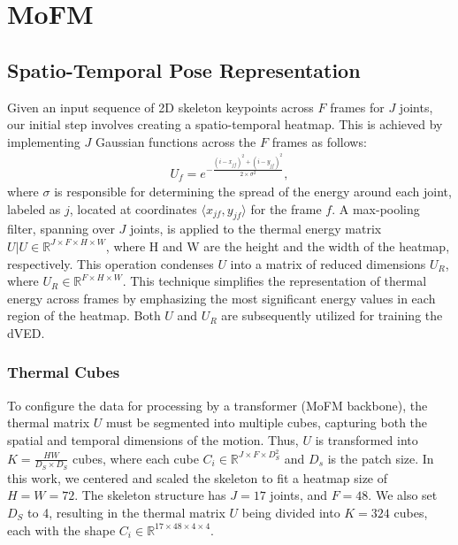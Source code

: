 \section{MoFM}
\label{sec:approch}


\subsection{Spatio-Temporal Pose Representation}
Given an input sequence of 2D skeleton keypoints across $F$ frames for $J$ joints,  our initial step involves creating a spatio-temporal heatmap. This is achieved by implementing $J$ Gaussian functions across the $F$ frames as follows:
\begin{align}
U_f=e^{-\frac{(i-x_{jf})^2+(i-y_{jf})^2}{2\times\sigma^2}}, \label{eq:guss_factor}
\end{align}
where $\sigma$ is responsible for determining the spread of the energy around each joint, labeled as $j$, located at coordinates $\langle x_{jf}, y_{jf}\rangle$ for the frame $f$.  A max-pooling filter, spanning over \( J \) joints, is applied to the thermal energy matrix \( U | U \in \mathbb{R}^{J \times F \times H \times W} \), where H and W are the height and the width of the heatmap, respectively. This operation condenses \( U \) into a matrix of reduced dimensions \( U_R \), where \( U_R \in \mathbb{R}^{F \times H \times W} \). This technique simplifies the representation of thermal energy across frames by emphasizing the most significant energy values in each region of the heatmap. Both \( U \) and \( U_R \) are subsequently utilized for training the dVED.

\subsubsection{Thermal Cubes}
To configure the data for processing by a transformer (MoFM backbone), the thermal matrix \(U\) must be segmented into multiple cubes, capturing both the spatial and temporal dimensions of the motion. Thus, \(U\) is transformed into \(K = \frac{HW}{D_S \times D_S}\) cubes, where each cube \(C_i \in \mathbb{R}^{J \times F \times D_S^2}\) and $D_s$ is the patch size. In this work, we centered and scaled the skeleton to fit a heatmap size of \(H = W = 72\). The skeleton structure has \(J = 17\) joints, and \(F = 48\). We also set \(D_S\) to 4, resulting in the thermal matrix \(U\) being divided into \(K = 324\) cubes, each with the shape \(C_i \in \mathbb{R}^{17 \times 48 \times 4 \times 4}\).

